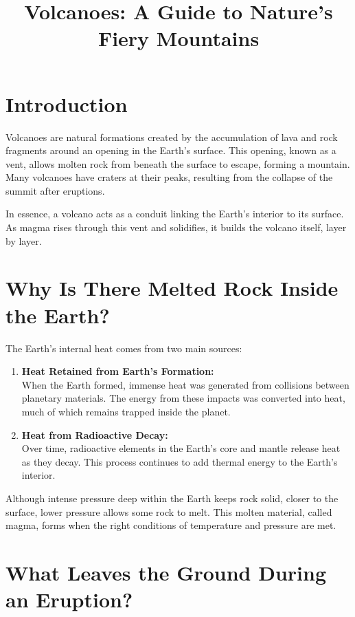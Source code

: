 \documentclass{article}
\title{Volcanoes: A Guide to Nature's Fiery Mountains}
\author{}
\date{}
\begin{document}
\maketitle

\section*{Introduction}

Volcanoes are natural formations created by the accumulation of lava and rock fragments around an opening in the Earth's surface. This opening, known as a vent, allows molten rock from beneath the surface to escape, forming a mountain. Many volcanoes have craters at their peaks, resulting from the collapse of the summit after eruptions.

In essence, a volcano acts as a conduit linking the Earth's interior to its surface. As magma rises through this vent and solidifies, it builds the volcano itself, layer by layer.

\section*{Why Is There Melted Rock Inside the Earth?}

The Earth's internal heat comes from two main sources:

\begin{enumerate}
    \item \textbf{Heat Retained from Earth's Formation:} \\
    When the Earth formed, immense heat was generated from collisions between planetary materials. The energy from these impacts was converted into heat, much of which remains trapped inside the planet.

    \item \textbf{Heat from Radioactive Decay:} \\
    Over time, radioactive elements in the Earth's core and mantle release heat as they decay. This process continues to add thermal energy to the Earth's interior.
\end{enumerate}

Although intense pressure deep within the Earth keeps rock solid, closer to the surface, lower pressure allows some rock to melt. This molten material, called magma, forms when the right conditions of temperature and pressure are met.

\section*{What Leaves the Ground During an Eruption?}
\end{document}
